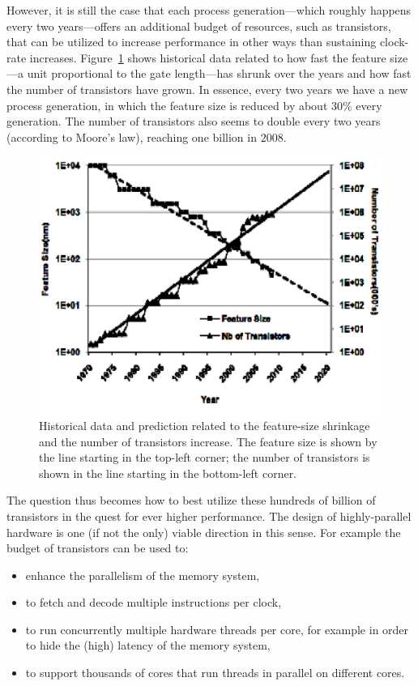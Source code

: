 \documentclass[acmsmall,review]{acmart}\settopmatter{printfolios=true,printccs=false,printacmref=false}
\begin{document}
However, it is still the case that each process generation---which
roughly happens every two years---offers an additional budget of 
resources, such as transistors, that can be utilized to increase 
performance in other ways than sustaining clock-rate increases.
Figure~\ref{fig:feature-size} shows historical data related to how 
fast the feature size---a unit proportional to the gate length---has 
shrunk over the years and how fast the number of transistors have
grown. In essence, every two years we have a new process generation,
in which the feature size is reduced by about $30\%$ every generation.
The number of transistors also seems to double every two years 
(according to Moore's law), reaching one billion in $2008$.


\begin{figure}
\includegraphics[width=90ex]{Figures/L1/FeatureSize} 
\caption{Historical data and prediction related to the feature-size 
         shrinkage and the number of transistors increase. The feature 
         size is shown by the line starting in the top-left corner;
         the number of transistors is shown in the line starting in 
         the bottom-left corner.}
\label{fig:feature-size}
\end{figure} 

The question thus becomes how to best utilize these hundreds of
billion of transistors in the quest for ever higher performance.
The design of highly-parallel hardware is one (if not the only)
viable direction in this sense. For example the budget of 
transistors can be used to:
\begin{itemize}
    \item enhance the parallelism of the memory system,
    \item to fetch and decode multiple instructions per clock,
    \item to run concurrently multiple hardware threads per 
            core, for example in order to hide the (high) latency
            of the memory system,
    \item to support thousands of cores that run threads in 
            parallel on different cores.
\end{itemize}
\end{document}
